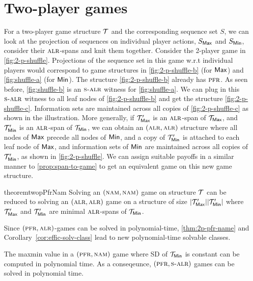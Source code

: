 

\section{Two-player games}\label{sec:two-player}

For a two-player game structure $\mathcal{T}$ and the corresponding sequence set $S$, we can look at the projection of sequences on individual player actions, $S_{\mathsf{Max}}$ and $S_{\mathsf{Min}}$, consider their $\textsc{alr}$-spans and knit them together. %
Consider the 2-player game in \cref{fig:2-p-shuffle}. Projections of the sequence set in this game w.r.t individual players would correspond to game structures in \cref{fig:2-p-shuffle-b} (for $\mathsf{Max}$) and \cref{fig:shuffle-a}  (for $\mathsf{Min}$). The structure \cref{fig:2-p-shuffle-b}  already has $\textsc{pfr}$. As seen before, \cref{fig:shuffle-b} is an $\textsc{s-alr}$ witness for \cref{fig:shuffle-a}. We can plug in this $\textsc{s-alr}$ witness to all leaf nodes of \cref{fig:2-p-shuffle-b} and get the structure \cref{fig:2-p-shuffle-c}. Information sets are maintained across all copies of \cref{fig:2-p-shuffle-c} as shown in the illustration. More generally, if $\mathcal{T}'_{\mathsf{Max}}$ is an $\textsc{alr}$-span of $\mathcal{T}_{\mathsf{Max}}$, and $\mathcal{T}'_{\mathsf{Min}}$ is an $\textsc{alr}$-span of $\mathcal{T}_{\mathsf{Min}}$, we can obtain an $(\textsc{alr}, \textsc{alr})$ structure where all nodes of $\mathsf{Max}$ precede all nodes of $\mathsf{Min}$, and a copy of $\mathcal{T}'_{\mathsf{Min}}$ is attached to each leaf node of $\mathsf{Max}$, and information sets of $\mathsf{Min}$ are maintained across all copies of $\mathcal{T}'_{\mathsf{Min}}$, as shown in \cref{fig:2-p-shuffle}.  
We can assign suitable payoffs in a similar manner to \cref{prop:span-to-game} to get an equivalent game on this new game structure. 


\begin{restatable}{theorem}{twopPfrNam}\label{thm:2p-pfr-name}
Solving an $(\textsc{nam}, \textsc{nam})$ game on structure $\mathcal{T}$ can be reduced to solving an $(\textsc{alr},\textsc{alr})$ game on a structure of size $|\mathcal{T}'_{\mathsf{Max}}||\mathcal{T}'_{\mathsf{Min}}|$ where $\mathcal{T}'_{\mathsf{Max}}$ and $\mathcal{T}'_{\mathsf{Min}}$ are minimal $\textsc{alr}$-spans of $\mathcal{T}_{\mathsf{Min}}$.
\end{restatable}
Since $(\textsc{pfr}, \textsc{alr})$-games can be solved in polynomial-time, \cref{thm:2p-pfr-name} and Corollary~\ref{cor:effic-solv-class} lead to new polynomial-time solvable classes.
\begin{corollary}\label{cor:2-effic-solv-class}
The maxmin value in a $(\textsc{pfr}, \textsc{nam})$ game where SD of $\mathcal{T}_{\mathsf{Min}}$ is constant can be computed in polynomial time. As a conseqeunce, $(\textsc{pfr}, \textsc{s-alr})$ games can be solved in polynomial time.
\end{corollary}



\endinput


